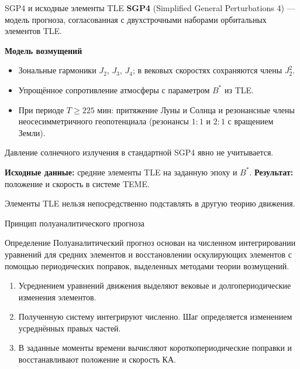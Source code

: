 \documentclass[11pt,aspectratio=169,t]{beamer}
\begin{document}
\begin{frame}{SGP4 и исходные элементы TLE}
\justifying
\textbf{SGP4} (Simplified General Perturbations 4) --- модель прогноза, согласованная с двухстрочными наборами орбитальных элементов TLE.\par\smallskip
\textbf{\color{courseaccent}Модель возмущений}
\begin{itemize}\setlength{\itemsep}{2pt}
\item Зональные гармоники $J_2$, $J_3$, $J_4$; в вековых скоростях сохраняются члены $J_2^2$.
\item Упрощённое сопротивление атмосферы с параметром $B^*$ из TLE.
\item При периоде $T\geq225$ мин: притяжение Луны и Солнца и резонансные члены неосесимметричного геопотенциала (резонансы $1{:}1$ и $2{:}1$ с вращением Земли).
\end{itemize}
\justifying
Давление солнечного излучения в стандартной SGP4 явно не учитывается.\par\smallskip
\textbf{Исходные данные:} средние элементы TLE на заданную эпоху и $B^*$. \textbf{Результат:} положение и скорость в системе TEME.\par\smallskip
Элементы TLE нельзя непосредственно подставлять в другую теорию движения.\par
\end{frame}

\begin{frame}{Принцип полуаналитического прогноза}
\begin{block}{Определение}
\justifying
Полуаналитический прогноз основан на численном интегрировании уравнений для средних элементов и восстановлении оскулирующих элементов с помощью периодических поправок, выделенных методами теории возмущений.
\end{block}
\begin{enumerate}
\item Усреднением уравнений движения выделяют вековые и долгопериодические изменения элементов.
\item Полученную систему интегрируют численно. Шаг определяется изменением усреднённых правых частей.
\item В заданные моменты времени вычисляют короткопериодические поправки и восстанавливают положение и скорость КА.
\end{enumerate}
\end{frame}
\end{document}
